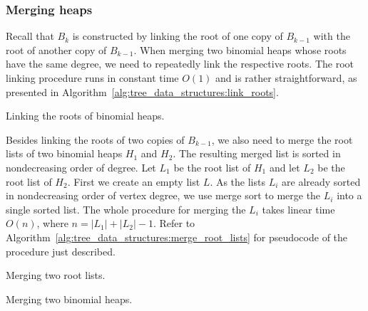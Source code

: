 
\subsubsection{Merging heaps}

Recall that $B_k$ is constructed by linking the root of one copy of
$B_{k-1}$ with the root of another copy of $B_{k-1}$. When merging two
binomial heaps whose roots have the same degree, we need to repeatedly
link the respective roots. The root linking procedure runs in constant
time $O(1)$ and is rather straightforward, as presented in
Algorithm~\ref{alg:tree_data_structures:link_roots}.

\begin{algorithm}[!htbp]

\caption{Linking the roots of binomial heaps.}
\label{alg:tree_data_structures:link_roots}
\end{algorithm}

Besides linking the roots of two copies of $B_{k-1}$, we also need to
merge the root lists of two binomial heaps $H_1$ and $H_2$. The
resulting merged list is sorted in nondecreasing order of degree. Let
$L_1$ be the root list of $H_1$ and let $L_2$ be the root list of
$H_2$. First we create an empty list $L$. As the lists $L_i$ are
already sorted in nondecreasing order of vertex degree, we use
merge sort to merge the $L_i$ into a single sorted
list. The whole procedure for merging the $L_i$ takes linear time
$O(n)$, where $n = |L_1| + |L_2| - 1$. Refer to
Algorithm~\ref{alg:tree_data_structures:merge_root_lists} for
pseudocode of the procedure just described.

\begin{algorithm}[!htbp]

\caption{Merging two root lists.}
\label{alg:tree_data_structures:merge_root_lists}
\end{algorithm}

\begin{algorithm}[!htbp]

\caption{Merging two binomial heaps.}
\label{alg:tree_data_structures:merge_binomial_heaps}
\end{algorithm}

